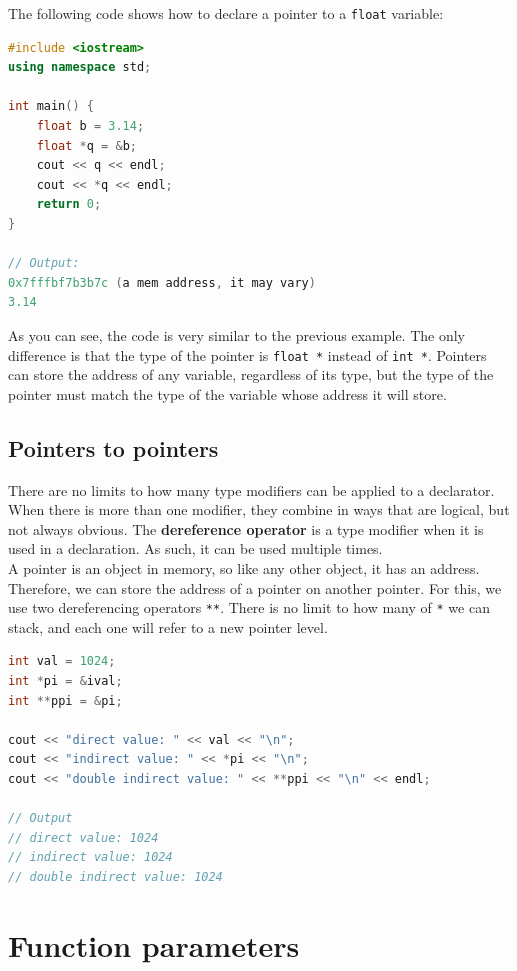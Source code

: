 The following code shows how to declare a pointer to a \texttt{float} variable:

\begin{lstlisting}[language=C++]
#include <iostream>
using namespace std;

int main() {
    float b = 3.14;
    float *q = &b;
    cout << q << endl;
    cout << *q << endl;
    return 0;
}

// Output:
0x7fffbf7b3b7c (a mem address, it may vary)
3.14
\end{lstlisting}

As you can see, the code is very similar to the previous example. The only
difference is that the type of the pointer is \texttt{float *} instead of
\texttt{int *}. Pointers can store the address of any variable, regardless of its
type, but the type of the pointer must match the type of the variable whose
address it will store.

\subsection{Pointers to pointers}

There are no limits to how many type modifiers can be applied to a declarator.
When there is more than one modifier, they combine in ways that are logical, but
not always obvious. The \textbf{dereference operator} is a type modifier when 
it is used in a declaration. As such, it can be used multiple times.\\

A pointer is an object in memory, so like any other object, it has an address.
Therefore, we can store the address of a pointer on another pointer. For this,
we use two dereferencing operators \texttt{**}. There is no limit to how many 
of \texttt{*} we can stack, and each one will refer to a new pointer level.\\

\begin{lstlisting}[language=C++]
int val = 1024;
int *pi = &ival;
int **ppi = &pi;

cout << "direct value: " << val << "\n";
cout << "indirect value: " << *pi << "\n";
cout << "double indirect value: " << **ppi << "\n" << endl;

// Output
// direct value: 1024
// indirect value: 1024
// double indirect value: 1024
\end{lstlisting}

\section{Function parameters}

